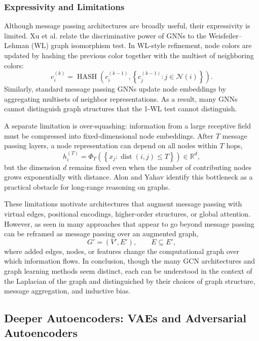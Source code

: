 \documentclass[11pt]{article}
\theoremstyle{definition}
\begin{document}
\subsubsection{Expressivity and Limitations}
Although message passing architectures are broadly useful, their expressivity is limited. 
Xu et al. \cite{xu2019powerful} relate the discriminative power of GNNs to the Weisfeiler--Lehman (WL) graph isomorphism test. 
In WL-style refinement, node colors are updated by hashing the previous color together with the multiset of neighboring colors:
\[
    c_i^{(k)}
    = \operatorname{HASH}\!\left(
        c_i^{(k-1)},
        \left\{c_j^{(k-1)} : j\in\mathcal{N}(i)\right\}
      \right).
\]
Similarly, standard message passing GNNs update node embeddings by aggregating multisets of neighbor representations. As a result, many GNNs cannot distinguish graph structures that the 1-WL test cannot distinguish.

A separate limitation is over-squashing: information from a large receptive field must be compressed into fixed-dimensional node embeddings. After $T$ message passing layers, a node representation can depend on all nodes within $T$ hops,
\[
    h_i^{(T)}
    = \Phi_T\!\left(\left\{x_j : \operatorname{dist}(i,j)\leq T\right\}\right)
    \in \mathbb{R}^d,
\]
but the dimension $d$ remains fixed even when the number of contributing nodes grows exponentially with distance. Alon and Yahav \cite{alon2021bottleneck} identify this bottleneck as a practical obstacle for long-range reasoning on graphs.

These limitations motivate architectures that augment message passing with virtual edges, positional encodings, higher-order structures, or global attention.
However, as seen in \cite{velickovic2022message} many approaches that appear to go beyond message passing can be reframed as message passing over an augmented graph,
\[
    G' = (V',E'),
    \qquad
    E \subseteq E',
\]
where added edges, nodes, or features change the computational graph over which information flows.
In conclusion, though the many GCN architectures and graph learning methods seem distinct, each can be understood in the context of the Laplacian of the graph and distinguiched by their choices of graph structure, message aggregation, and inductive bias.

\subsection{Deeper Autoencoders: VAEs and Adversarial Autoencoders}
\label{subsec:autoencoders}
\end{document}
